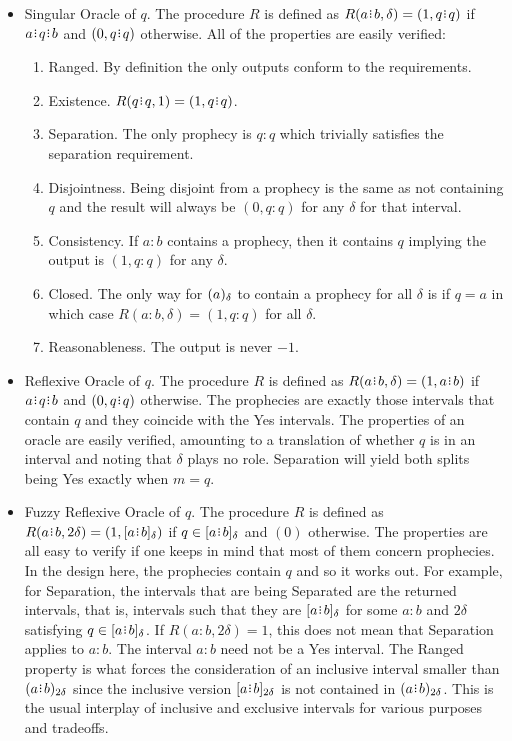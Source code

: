 \documentclass[12pt]{article}
\begin{document}
\begin{itemize}
    \item Singular Oracle of $q$. The procedure $R$ is defined as $R(a \rint b,\delta) = (1, q \rint q)$ if $a \rint q \rint b$ and $(0, q \rint q)$ otherwise. All of the properties are easily verified: 
    \begin{enumerate} 
        \item Ranged. By definition the only outputs conform to the requirements. 
        \item Existence. $R(q\rint q, 1) = (1, q\rint q)$.
        \item Separation. The only prophecy is $q:q$ which trivially satisfies the separation requirement. 
        \item Disjointness. Being disjoint from a prophecy is the same as not containing $q$ and the result will always be $(0, q:q)$ for any $\delta$ for that interval. 
        \item Consistency. If $a:b$ contains a prophecy, then it contains $q$ implying the output is $(1,q:q)$ for any $\delta$.
        \item Closed. The only way for $(a)_{\delta}$ to contain a prophecy for all $\delta$ is if $q = a$ in which case $R(a:b, \delta) = (1, q:q)$ for all $\delta$. 
        \item Reasonableness. The output is never $-1$.
    \end{enumerate}
    
    \item Reflexive Oracle of $q$. The procedure $R$ is defined as $R(a\rint b, \delta) = (1, a\rint b)$ if $a\rint q \rint b$ and $(0, q \rint q)$ otherwise. The prophecies are exactly those intervals that contain $q$ and they coincide with the Yes intervals. The properties of an oracle are easily verified, amounting to a translation of whether $q$ is in  an interval and noting that $\delta$ plays no role. Separation will yield both splits being Yes exactly when $m=q$. 

    \item Fuzzy Reflexive Oracle of $q$. The procedure $R$ is defined as $R(a\rint b, 2\delta) = (1, \clhalo{a\rint b})$ if $q \in \clhalo{a\rint  b}$ and $(0)$ otherwise. The properties are all easy to verify if one keeps in mind that most of them concern prophecies. In the design here, the prophecies contain $q$ and so it works out. For example, for Separation, the intervals that are being Separated are the returned intervals, that is, intervals such that they are $\clhalo{a\rint  b}$ for some $a:b$ and $2\delta$ satisfying $q \in \clhalo{a\rint  b}$. If $R(a:b, 2\delta) = 1$, this does not mean that Separation applies to $a:b$. The interval $a:b$ need not be a Yes interval. The Ranged property is what forces the consideration of an inclusive interval smaller than $\halo[2\delta]{a \rint b}$ since the inclusive version $\clhalo[2 \delta]{a \rint b}$ is not contained in $\halo[2 \delta]{a \rint b}$. This is the usual interplay of inclusive and exclusive intervals for various purposes and tradeoffs. 


\end{itemize}
\end{document}
